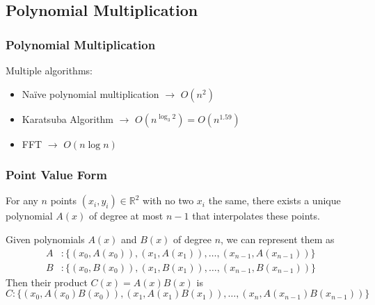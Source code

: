 \documentclass[
	11pt, %
]{beamer}
\begin{document}

\subsection{Polynomial Multiplication}

\begin{frame}
    \frametitle{Polynomial Multiplication}
    Multiple algorithms:
    \begin{itemize}
        \item Naïve polynomial multiplication $\longrightarrow$ $O(n^2)$
        \item Karatsuba Algorithm $\longrightarrow$ $O(n^{\log_3 2}) = O(n^{1.59})$
        \item FFT $\longrightarrow$ $O(n\log n)$
    \end{itemize}
\end{frame}



\begin{frame}
    \frametitle{Point Value Form}
    \begin{theorem}
        For any $n$ points $(x_i, y_i) \in \mathbb R^2$ with no two $x_i$ the same, there exists a unique polynomial $A(x)$ of degree at most $n-1$ that interpolates these points.
    \end{theorem}
    Given polynomials $A(x)$ and $B(x)$ of degree $n$, we can represent them as
    \begin{align*}
        A & : \{(x_0, A(x_0)), (x_1, A(x_1)),\dots , (x_{n-1}, A(x_{n-1})) \} \\
        B & : \{(x_0, B(x_0)), (x_1, B(x_1)),\dots , (x_{n-1}, B(x_{n-1})) \}
    \end{align*}
    Then their product $C(x) = A(x)B(x)$ is
    \[
        C: \{(x_0, A(x_0)B(x_0)), (x_1, A(x_1)B(x_1)),\dots , (x_n, A(x_{n-1})B(x_{n-1})) \}
    \]
\end{frame}


\end{document}
